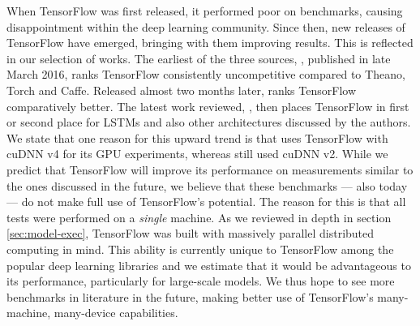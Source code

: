 When TensorFlow was first released, it performed poor on benchmarks, causing
disappointment within the deep learning community. Since then, new releases of
TensorFlow have emerged, bringing with them improving results. This is reflected
in our selection of works. The earliest of the three sources, \cite{bosch},
published in late March 2016, ranks TensorFlow consistently uncompetitive
compared to Theano, Torch and Caffe. Released almost two months later,
\cite{convnet-bench} ranks TensorFlow comparatively better. The latest work
reviewed, \cite{theano}, then places TensorFlow in first or second place for
LSTMs and also other architectures discussed by the authors. We state that one
reason for this upward trend is that \cite{theano} uses TensorFlow with cuDNN v4
for its GPU experiments, whereas \cite{bosch} still used cuDNN v2. While we
predict that TensorFlow will improve its performance on measurements similar to
the ones discussed in the future, we believe that these benchmarks --- also
today --- do not make full use of TensorFlow's potential. The reason for this is
that all tests were performed on a \emph{single} machine. As we reviewed in
depth in section \ref{sec:model-exec}, TensorFlow was built with massively
parallel distributed computing in mind. This ability is currently unique to
TensorFlow among the popular deep learning libraries and we estimate that it
would be advantageous to its performance, particularly for large-scale
models. We thus hope to see more benchmarks in literature in the future, making
better use of TensorFlow's many-machine, many-device capabilities.

